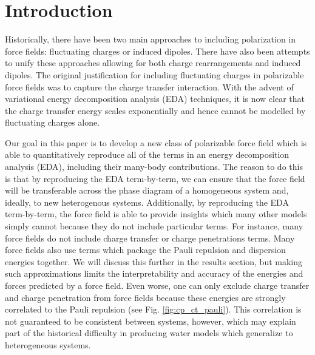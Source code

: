 \documentclass[journal=jacsat,manuscript=article]{achemso}
\begin{document}
\section{Introduction}
Historically, there have been two main approaches to including
polarization in force fields: fluctuating charges\cite{rick1994dynamical}
or induced dipoles\cite{applequist1985multipole}. There have also been
attempts to unify these approaches allowing for both charge rearrangements
and induced dipoles.\cite{stern2001combined} The original justification for
including fluctuating charges in polarizable force fields was to
capture the charge transfer interaction.\cite{rick1994dynamical} With the advent
of variational energy decomposition analysis (EDA) techniques\cite{horn2016probing,mao2021intermolecular},
it is now clear that the charge transfer energy scales exponentially and hence
cannot be modelled by fluctuating charges alone.

Our goal in this paper is to develop a new class of polarizable
force field which is able to quantitatively reproduce all of the terms
in an energy decomposition analysis (EDA)\cite{horn2016probing,mao2021intermolecular},
including their many-body contributions. The reason to do this
is that by reproducing the EDA term-by-term, we can ensure that the force
field will be transferable across the phase diagram of a homogeneous
system and, ideally, to new heterogenous systems.
Additionally, by reproducing the EDA term-by-term, the force field
is able to provide insights which many other models simply cannot because
they do not include particular terms. For instance, many force fields
do not include charge transfer or charge penetrations terms.
Many force fields also use terms which package the Pauli repulsion and dispersion 
energies together. We will discuss this further in the results section,
but making such approximations limits the interpretability and accuracy of the
energies and forces predicted by a force field. Even worse, one can only
exclude charge transfer and charge penetration from force fields because
these energies are strongly correlated to the Pauli repulsion (see Fig. \ref{fig:cp_ct_pauli}).
This correlation is not guaranteed to be consistent between systems, however,
which may explain part of the historical difficulty in producing water models which
generalize to heterogeneous systems.
\end{document}
